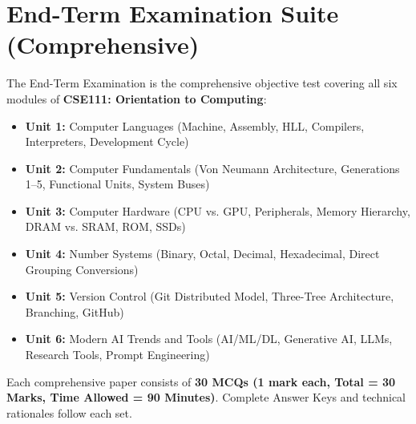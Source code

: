 \documentclass[a4paper,11pt,oneside,openany]{book}
\begin{document}
\newpage





\chapter{End-Term Examination Suite (Comprehensive)}
\label{chap:endterm_suite}
\noindent
The End-Term Examination is the comprehensive objective test covering all six modules of \textbf{CSE111: Orientation to Computing}:
\begin{itemize}[leftmargin=8mm]
    \item \textbf{Unit 1:} Computer Languages (Machine, Assembly, HLL, Compilers, Interpreters, Development Cycle)
    \item \textbf{Unit 2:} Computer Fundamentals (Von Neumann Architecture, Generations 1--5, Functional Units, System Buses)
    \item \textbf{Unit 3:} Computer Hardware (CPU vs. GPU, Peripherals, Memory Hierarchy, DRAM vs. SRAM, ROM, SSDs)
    \item \textbf{Unit 4:} Number Systems (Binary, Octal, Decimal, Hexadecimal, Direct Grouping Conversions)
    \item \textbf{Unit 5:} Version Control (Git Distributed Model, Three-Tree Architecture, Branching, GitHub)
    \item \textbf{Unit 6:} Modern AI Trends and Tools (AI/ML/DL, Generative AI, LLMs, Research Tools, Prompt Engineering)
\end{itemize}
Each comprehensive paper consists of \textbf{30 MCQs (1 mark each, Total = 30 Marks, Time Allowed = 90 Minutes)}. Complete Answer Keys and technical rationales follow each set.

\newpage




\end{document}

